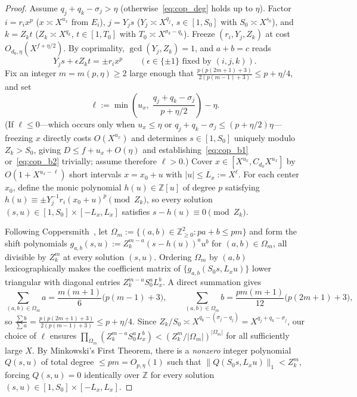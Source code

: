 \documentclass[11pt,a4paper]{amsart}
\theoremstyle{plain}
\theoremstyle{definition}
\theoremstyle{remark}
\newcommand{\Z}{\mathbb{Z}}
\begin{document}
\begin{proof}
Assume $q_j + q_k - \sigma_j > \eta$ (otherwise~\eqref{eq:cop_deg} holds up to $\eta$). Factor $i = r_i x^p$ ($x \asymp X^{u_x}$ from $E_i$), $j = Y_j s$ ($Y_j \asymp X^{q_j}$, $s \in [1, S_0]$ with $S_0 \asymp X^{s_0}$), and $k = Z_k t$ ($Z_k \asymp X^{q_k}$, $t \in [1, T_0]$ with $T_0 \asymp X^{\sigma_k - q_k}$). Freeze $(r_i, Y_j, Z_k)$ at cost $O_{d_0,\eta}(X^{f+\eta/2})$. By coprimality, $\gcd(Y_j, Z_k) = 1$, and $a + b = c$ reads
\begin{equation}\label{eq:cop_eq}
  Y_j s + \epsilon Z_k t = \pm r_i x^p \qquad (\epsilon \in \{\pm 1\} \text{ fixed by } (i,j,k)).
\end{equation}
Fix an integer $m = m(p, \eta) \ge 2$ large enough that $\frac{p(p(2m+1)+3)}{2(p(m-1)+3)} \le p + \eta/4$, and set
\[
  \ell := \min\!\left(u_x,\; \frac{q_j + q_k - \sigma_j}{p + \eta/2}\right) - \eta.
\]
(If $\ell \le 0$—which occurs only when $u_x \le \eta$ or $q_j + q_k - \sigma_j \le (p + \eta/2)\eta$—freezing $x$ directly costs $O(X^{u_x})$ and determines $s \in [1, S_0]$ uniquely modulo $Z_k > S_0$, giving $D \le f + u_x + O(\eta)$ and establishing~\eqref{eq:cop_b1} or~\eqref{eq:cop_b2} trivially; assume therefore $\ell > 0$.) Cover $x \in [X^{u_x}, C_{d_0} X^{u_x}]$ by $O(1 + X^{u_x - \ell})$ short intervals $x = x_0 + u$ with $|u| \le L_x := X^\ell$. For each center $x_0$, define the monic polynomial $h(u) \in \Z[u]$ of degree $p$ satisfying $h(u) \equiv \pm Y_j^{-1} r_i (x_0 + u)^p \pmod{Z_k}$, so every solution $(s, u) \in [1, S_0] \times [-L_x, L_x]$ satisfies $s - h(u) \equiv 0 \pmod{Z_k}$.

Following Coppersmith~\cite{Coppersmith1997}, let $\Omega_m := \{(a,b) \in \Z_{\ge 0}^2 : p a + b \le p m\}$ and form the shift polynomials $g_{a,b}(s, u) := Z_k^{m-a} (s - h(u))^a u^b$ for $(a,b) \in \Omega_m$, all divisible by $Z_k^m$ at every solution $(s, u)$. Ordering $\Omega_m$ by $(a, b)$ lexicographically makes the coefficient matrix of $\{g_{a,b}(S_0 s, L_x u)\}$ lower triangular with diagonal entries $Z_k^{m-a} S_0^a L_x^b$. A direct summation gives
\[
  \sum_{(a,b) \in \Omega_m} a = \frac{m(m+1)}{6}\bigl(p(m-1) + 3\bigr), \qquad
  \sum_{(a,b) \in \Omega_m} b = \frac{p m(m+1)}{12}\bigl(p(2m+1) + 3\bigr),
\]
so $\frac{\sum b}{\sum a} = \frac{p(p(2m+1)+3)}{2(p(m-1)+3)} \le p + \eta/4$. Since $Z_k / S_0 \asymp X^{q_k - (\sigma_j - q_j)} = X^{q_j + q_k - \sigma_j}$, our choice of $\ell$ ensures $\prod_{\Omega_m} (Z_k^{m-a} S_0^a L_x^b) < (Z_k^m / |\Omega_m|)^{|\Omega_m|}$ for all sufficiently large $X$. By Minkowski's First Theorem, there is a \emph{nonzero} integer polynomial $Q(s, u)$ of total degree $\le p m = O_{p,\eta}(1)$ such that $\|Q(S_0 s, L_x u)\|_1 < Z_k^m$, forcing $Q(s, u) = 0$ identically over $\Z$ for every solution $(s, u) \in [1, S_0] \times [-L_x, L_x]$.


\end{proof}
\end{document}
